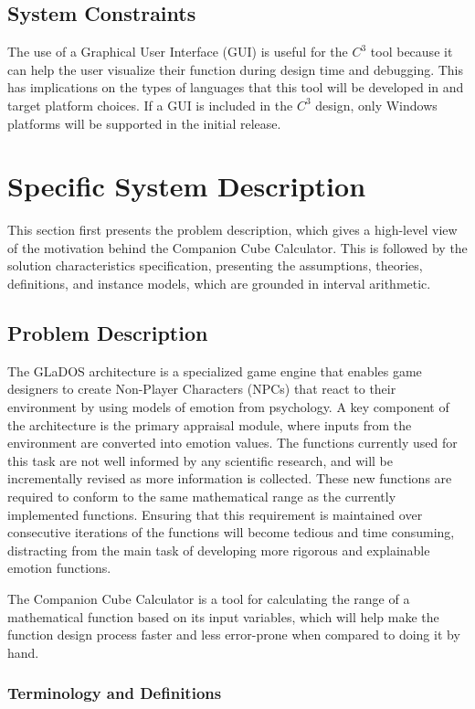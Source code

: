 \documentclass[12pt]{article}
\newcommand{\progname}{Companion Cube Calculator} %
\newcommand{\prognameAbbrv}{$C^{3}$}
\begin{document}
\subsection{System Constraints}
The use of a Graphical User Interface (GUI) is useful for the \prognameAbbrv{} 
tool because it can help the user visualize their function during design time 
and debugging. This has implications on the types of languages that this tool 
will be developed in and target platform choices. If a GUI is included in the 
\prognameAbbrv{} design, only Windows platforms will be supported in the 
initial release.

\section{Specific System Description}
\label{specific}
This section first presents the problem description, which gives a high-level
view of the motivation behind the \progname{}. This is followed by the solution 
characteristics specification, presenting the assumptions, theories, 
definitions, and instance models, which are grounded in interval arithmetic. 

\subsection{Problem Description} \label{Sec_pd}
The GLaDOS architecture is a specialized game engine that enables game 
designers to create Non-Player Characters (NPCs) that react to their 
environment by using models of emotion from psychology. A key component of the 
architecture is the primary appraisal module, where inputs from the environment 
are converted into emotion values. The functions currently used for this task 
are not well informed by any scientific research, and will be incrementally 
revised as more information is collected. These new functions are required to 
conform to the same mathematical range as the currently implemented functions. 
Ensuring that this requirement is maintained over consecutive iterations of the 
functions will become tedious and time consuming, distracting from the main 
task of developing more rigorous and explainable emotion functions.

The \progname{} is a tool for calculating the range of a mathematical function 
based on its input variables, which will help make the function design process 
faster and less error-prone when compared to doing it by hand.

\subsubsection{Terminology and  Definitions}
\end{document}
